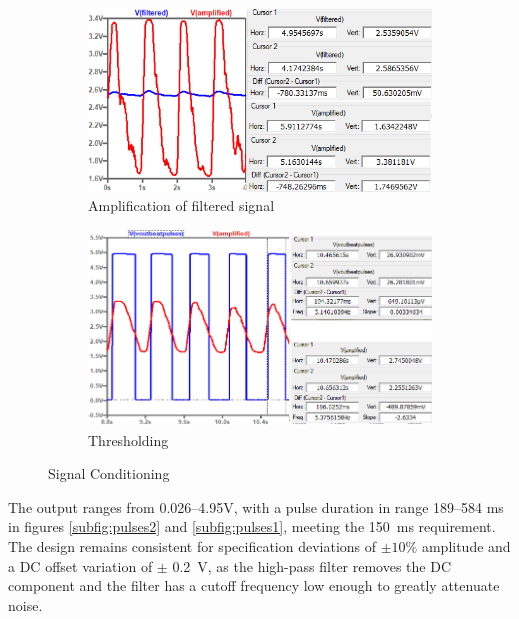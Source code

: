 \begin{figure}[h]
 \footnotesize
   \centering
   \begin{subfigure}[]{0.49\textwidth}
        \includegraphics[width=\linewidth]{./Figures/amplified}
	  \caption{Amplification of filtered signal} \label{subfig:amplified}	
   \end{subfigure}
   \begin{subfigure}[]{0.49\textwidth}
  	 \includegraphics[width=\linewidth]{./Figures/pulses}
	  \caption{Thresholding} \label{subfig:pulses}	
   \end{subfigure}
   \caption{Signal Conditioning}
 \end{figure}
 
The output ranges from \numrange{0.026}{4.95}\si{V}, with a pulse duration in range \numrange{189}{584} \si{ms} in figures \ref{subfig:pulses2} and \ref{subfig:pulses1}, meeting the \SI{150}{ms} requirement. The design remains consistent for specification deviations of $\pm 10\%$ amplitude and a DC offset variation of $\pm$ \SI{0.2}{V}, as the high-pass filter removes the DC component and the filter has a cutoff frequency low enough to greatly attenuate noise.


